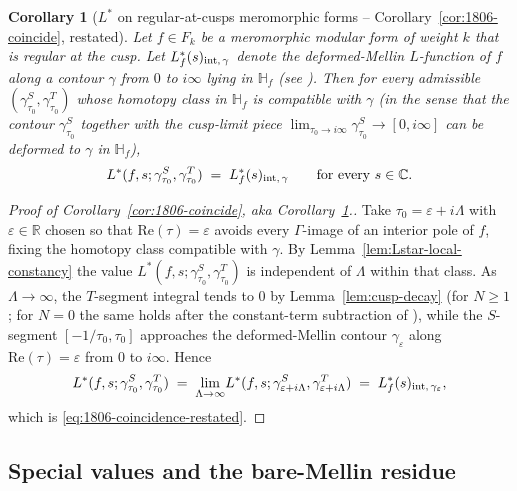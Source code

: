 \documentclass[11pt]{article}
\newtheorem{corollary}[theorem]{Corollary}
\numberwithin{equation}{section}  %
\newcommand{\HH}{\mathbb{H}}
\newcommand{\CC}{\mathbb{C}}
\newcommand{\RR}{\mathbb{R}}
\newcommand{\eps}{\varepsilon}
\begin{document}
\begin{corollary}[$L^*$ on regular-at-cusps meromorphic forms -- Corollary~\ref{cor:1806-coincide}, restated]\label{cor:1806-coincide2}
Let $f \in F_k$ be a meromorphic modular form of weight $k$ that is
regular at the cusp.  Let $L_f^*(s)_{\rm int,\,\gamma}$ denote the
deformed-Mellin $L$-function of $f$ along a contour $\gamma$ from
$0$ to $i\infty$ lying in $\HH_f$ (see \cite[\S2]{1806}).  Then for
every admissible $(\gamma^S_{\tau_0}, \gamma^T_{\tau_0})$ whose
homotopy class in $\HH_f$ is compatible with $\gamma$ (in the sense
that the contour $\gamma^S_{\tau_0}$ together with the cusp-limit
piece $\lim_{\tau_0 \to i\infty}\gamma^S_{\tau_0} \to [0, i\infty]$
can be deformed to $\gamma$ in $\HH_f$),
\begin{equation}\label{eq:1806-coincidence-restated}
  L^*(f, s; \gamma^S_{\tau_0}, \gamma^T_{\tau_0})
  \;=\; L_f^*(s)_{\rm int,\,\gamma}
  \qquad
  \text{for every } s \in \CC.
\end{equation}
\end{corollary}
\begin{proof}[Proof of Corollary~\ref{cor:1806-coincide}, aka Corollary~\ref{cor:1806-coincide2}.]
Take $\tau_0 = \eps + i\Lambda$ with $\eps \in \RR$ chosen so that
$\mathrm{Re}(\tau) = \eps$ avoids every $\Gamma$-image of an interior
pole of $f$, fixing the homotopy class compatible with $\gamma$.  By
Lemma~\ref{lem:Lstar-local-constancy} the value
$L^*(f, s; \gamma^S_{\tau_0}, \gamma^T_{\tau_0})$ is independent of
$\Lambda$ within that class.  As $\Lambda \to \infty$, the $T$-segment
integral tends to $0$ by Lemma~\ref{lem:cusp-decay} (for $N \ge 1$;
for $N = 0$ the same holds after the constant-term subtraction of
\cite[Lemma~2.1]{1806}), while the $S$-segment $[-1/\tau_0, \tau_0]$
approaches the deformed-Mellin contour $\gamma_\eps$ along
$\mathrm{Re}(\tau) = \eps$ from $0$ to $i\infty$.  Hence
\begin{equation}
  L^*(f, s; \gamma^S_{\tau_0}, \gamma^T_{\tau_0})
  \;=\; \lim_{\Lambda \to \infty}\!L^*(f, s; \gamma^S_{\eps + i\Lambda}, \gamma^T_{\eps + i\Lambda})
  \;=\; L_f^*(s)_{\rm int,\,\gamma_\eps},
\end{equation}
which is \eqref{eq:1806-coincidence-restated}.
\end{proof}

\subsection{Special values and the bare-Mellin residue}\label{subsec:special-values}
\end{document}

